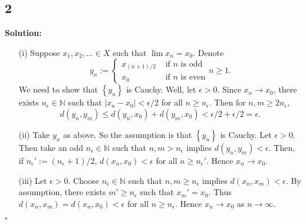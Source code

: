 \documentclass[12pt]{article}
\newcounter{ProofCounter}
\newenvironment{Solution}{\stepcounter{ProofCounter}\textbf{Solution:}}{\hfill$\square$}
\begin{document}
\newpage

\subsection*{2}
\begin{Solution}
\begin{enumerate}
  \item[(i)] Suppose $x_1, x_2, \dots \in X$ such that $\lim x_n = x_0$. Denote 
    \[
      y_n := \left\{ \begin{array}{cl}
          x_{(n+1)/2} & \text{ if $n$ is odd} \\
          x_0 & \text{ if $n$ is even}
      \end{array} \right. n \geq 1.
    \]
    We need to show that $\left\{ y_n \right\}$ is Cauchy. Well, let $\epsilon > 0$. Since $x_n \rightarrow x_0$, there exists $n_{\epsilon} \in
    \mathbb{N}$ such that $|x_n - x_0| < \epsilon / 2$ for all $n \geq n_{\epsilon}$. Then for $n,m \geq 2n_{\epsilon}$,
    \[
      d(y_n,y_m) \leq d(y_n, x_0) + d(y_m, x_0) < \epsilon / 2 + \epsilon / 2 = \epsilon.
    \]

  \item[(ii)] Take $y_n$ as above. So the assumption is that $\left\{ y_n \right\}$ is Cauchy. Let $\epsilon > 0$. Then take an odd $n_{\epsilon} \in
    \mathbb{N}$ such that $n,m > n_{\epsilon}$ implies $d(y_n,y_m) < \epsilon$.
    Then, if $n_{\epsilon}' := (n_{\epsilon} + 1) / 2$, $d(x_n, x_0) < \epsilon$ for all $n \geq n_{\epsilon}'$. Hence $x_n \rightarrow x_0$.

  \item[(iii)] Let $\epsilon > 0$. Choose $n_{\epsilon} \in \mathbb{N}$ such that $n,m \geq n_{\epsilon}$ implies $d(x_n,x_m) < \epsilon$. By
    assumption, there exists $m' \geq n_{\epsilon}$ such that $x_m' = x_0$. Thus $d(x_n, x_m) = d(x_n,x_0) < \epsilon$ for all $n \geq n_{\epsilon}$. Hence $x_n
    \rightarrow x_0$ as $n \rightarrow \infty$.
\end{enumerate}
\end{Solution}
\end{document}
